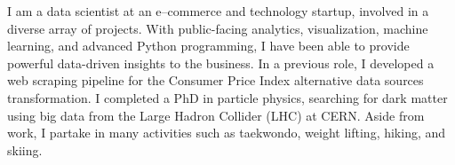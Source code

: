 
\begin{cvparagraph}
    I am a data scientist at an e--commerce and technology startup, involved in a diverse array of projects.
    With public-facing analytics, visualization, machine learning, and advanced Python programming, I have been able to provide powerful data-driven insights to the business.
    In a previous role, I developed a web scraping pipeline for the Consumer Price Index alternative data sources transformation.
    I completed a PhD in particle physics, searching for dark matter using big data from the Large Hadron Collider (LHC) at CERN\@.
    Aside from work, I partake in many activities such as taekwondo, weight lifting, hiking, and skiing.
\end{cvparagraph}
